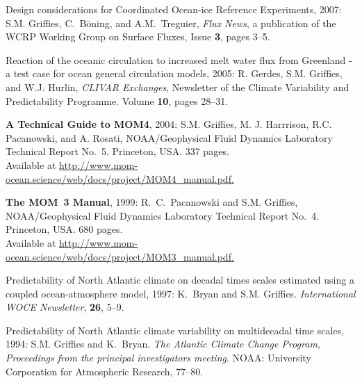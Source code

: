 \begin{etaremune}
\item Design considerations for Coordinated Ocean-ice Reference
  Experiments, 2007: S.M. Grif\/f\/ies, C.\ B\"oning, and A.M.\
  Treguier, {\em Flux News}, a publication of the WCRP Working Group
  on Surface Fluxes, Issue {\bf 3}, pages 3--5.

\item Reaction of the oceanic circulation to increased melt water flux
  from Greenland - a test case for ocean general circulation models,
  2005: R. Gerdes, S.M. Grif\/f\/ies, and W.J. Hurlin, {\em
    CLIVAR Exchanges}, Newsletter of the Climate Variability and
  Predictability Programme.  Volume {\bf 10}, pages 28--31.

\item {\bf A Technical Guide to MOM4}, 2004: S.M. Grif\/f\/ies,
M. J. Harrrison, R.C. Pacanowski, and A. Rosati, NOAA/Geophysical Fluid Dynamics Laboratory Technical Report No.\ 5. Princeton, USA.
337 pages.  \\
Available at  \href{http://www.mom-ocean.science/web/docs/project/MOM4_manual.pdf}{http://www.mom-ocean.science/web/docs/project/MOM4\_manual.pdf.}

\item {\bf The MOM~3 Manual}, 1999: R.\ C.\ Pacanowski and S.M. Grif\/f\/ies,  NOAA/Geophysical Fluid Dynamics Laboratory Technical Report No.\ 4. Princeton, USA.  680 pages.  \\
Available at
\href{http://www.mom-ocean.science/web/docs/project/MOM3_manual.pdf}{http://www.mom-ocean.science/web/docs/project/MOM3\_manual.pdf.}
  
\item Predictability of North Atlantic climate on decadal times scales
estimated using a coupled ocean-atmosphere model, 1997: K.\ Bryan and
S.M. Grif\/f\/ies.  {\em International WOCE Newsletter}, {\bf
26}, 5--9.

\item Predictability of North Atlantic climate variability on multidecadal 
time scales, 1994: S.M. Grif\/f\/ies and K.\ Bryan.  {\em The Atlantic Climate Change Program, Proceedings from the principal investigators meeting}.  NOAA: University Corporation for Atmospheric Research, 77--80.

\end{etaremune}

